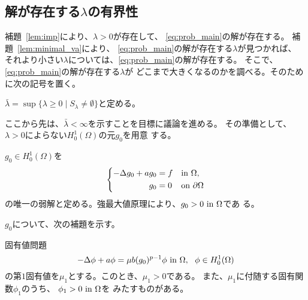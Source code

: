 \subsection{解が存在する$\lambda$の有界性}

補題~\ref{lem:imp}により、$\lambda > 0$が存在して、
\ref{eq:prob_main}の解が存在する。
補題~\ref{lem:minimal_va}により、
\ref{eq:prob_main}の解が存在する$\lambda$が見つかれば、
それより小さい$\lambda$については、\ref{eq:prob_main}の解が存在する。
そこで、\ref{eq:prob_main}の解が存在する$\lambda$が
どこまで大きくなるのかを調べる。そのために次の記号を置く。

\begin{nota} \label{nota:ext}
 $\bar{\lambda} = \sup \{ \lambda \geq 0 \mid S_\lambda \neq \emptyset
 \}$と定める。
\end{nota}

ここから先は、$\bar{\lambda} < \infty$を示すことを目標に議論を進める。
その準備として、$\lambda > 0$によらない$H_0^1(\Omega)$の元$g_0$を用意
する。

\begin{nota} \label{nota:g_0}
 $g_0 \in H_0^1(\Omega)$を
 \begin{align}
  \left\{
  \begin{aligned}
   -\Delta g_0 + a g_0 
    &= f  & &\text{in}~ \Omega,  \\
   g_0 &= 0 & &\text{on}~ \partial\Omega
  \end{aligned}
  \right. \label{eq:g_0}
 \end{align}
 の唯一の弱解と定める。強最大値原理により、$g_0 > 0 ~\text{in}~ \Omega$であ
 る。
\end{nota}
 
$g_0$について、次の補題を示す。

\begin{lem} \label{lem:g_0}
 固有値問題
 \[
  -\Delta \phi + a \phi = \mu b (g_0)^{p-1}\phi ~\text{in}~ \Omega, \ \
 \phi \in H_0^1(\Omega)
 \]
 の第$1$固有値を$\mu_1$とする。このとき、$\mu_1 > 0$である。
 また、$\mu_1$に付随する固有関数$\phi_1$のうち、
 $\phi_1 > 0 ~\text{in}~ \Omega$を
 みたすものがある。
\end{lem}

